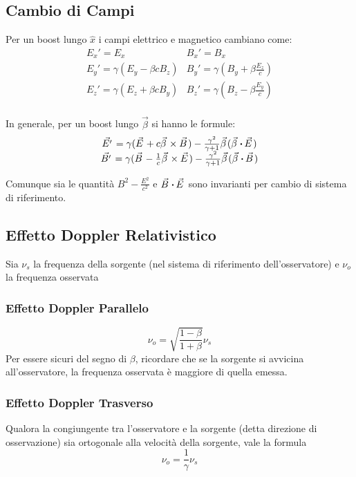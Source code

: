 \documentclass[10pt,a4paper]{article}
\begin{document}
\begin{multicols}{2}
  \subsection*{Cambio di Campi}
  Per un boost lungo $\hat x$ i campi elettrico e magnetico cambiano come:
  \begin{displaymath}
    \begin{array}{cc}
      E_x' = E_x & B_x' = B_x \\
      E_y' = \gamma (E_y - \beta c B_z) & B_y' = \gamma (B_y + \beta \frac{E_z}{c}) \\
      E_z' = \gamma (E_z + \beta c B_y) & B_z' = \gamma (B_z - \beta \frac{E_y}{c}) \\
    \end{array}
  \end{displaymath}

  In generale, per un boost lungo $\vec \beta$ si hanno le formule:
  \begin{displaymath}
    \begin{array}{c}
      \vec{E'} = \gamma (\vec E + c \vec \beta \times \vec B) - \frac{\gamma^2}{\gamma + 1} \vec \beta (\vec \beta \dotp \vec E) \\
      \vec{B'} = \gamma (\vec B - \frac{1}{c} \vec \beta \times \vec E) - \frac{\gamma^2}{\gamma + 1} \vec \beta (\vec \beta \dotp \vec B) \\
    \end{array}
  \end{displaymath}

  Comunque sia le quantità $B^2 - \frac{E^2}{c^2}$ e $\vec B \dotp \vec E$ sono invarianti per cambio di sistema di riferimento.

  \subsection*{Effetto Doppler Relativistico}
  Sia $\nu_s$ la frequenza della sorgente (nel sistema di riferimento dell'osservatore) e $\nu_o$ la frequenza osservata

  \subsubsection*{Effetto Doppler Parallelo}
  $$ \nu_o = \sqrt{\frac{1 - \beta}{1 + \beta}} \nu_s $$
  Per essere sicuri del segno di $\beta$, ricordare che se la sorgente si avvicina all'osservatore, la frequenza osservata è maggiore di quella emessa.
  
  \subsubsection*{Effetto Doppler Trasverso}
  Qualora la congiungente tra l'osservatore e la sorgente (detta direzione di osservazione) sia ortogonale alla velocità della sorgente, vale la formula
  $$ \nu_o = \frac{1}{\gamma} \nu_s $$


\end{multicols}
\end{document}

